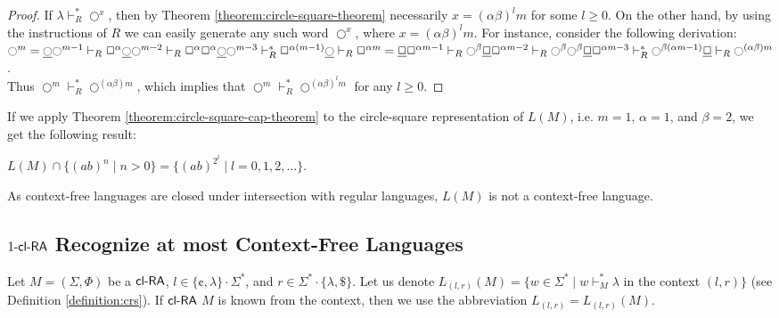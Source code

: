 \begin{proof}
If $\lambda \vdash_R^* \Circle^{x}$, then by Theorem \ref{theorem:circle-square-theorem} necessarily $x = (\alpha \beta)^l m$ for some $l \ge 0$. On the other hand, by using the instructions of $R$ we can easily generate any such word $\Circle^{x}$, where $x = (\alpha \beta)^l m$. For instance, consider the following derivation:\\
$\Circle^m = \underline{\Circle} \Circle^{m-1} \vdash_R \Square^{\alpha} \underline{\Circle} \Circle^{m-2} \vdash_R
\Square^{\alpha} \Square^{\alpha} \underline{\Circle} \Circle^{m-3} \vdash_R^*
\Square^{\alpha  (m-1)} \underline{\Circle} \vdash_R \Square^{\alpha  m} = \\
\underline{\Square} \Square^{\alpha  m - 1} \vdash_R
\Circle^{\beta} \underline{\Square} \Square^{\alpha  m - 2} \vdash_R
\Circle^{\beta} \Circle^{\beta} \underline{\Square} \Square^{\alpha  m - 3} \vdash_R^*
\Circle^{\beta (\alpha  m - 1)} \underline{\Square} \vdash_R \Circle^{(\alpha \beta)  m}$.\\
Thus $\Circle^m \vdash_R^* \Circle^{(\alpha \beta)  m}$, which implies that $\Circle^m \vdash_R^* \Circle^{(\alpha \beta)^l  m}$ for any $l \ge 0$.
\end{proof}

If we apply Theorem \ref{theorem:circle-square-cap-theorem} to the circle-square representation of $L(M)$, i.e. $m = 1$, $\alpha = 1$, and $\beta = 2$, we get the following result:

\begin{theorem}\label{theorem:4clRA}
$L(M) \cap \{(ab)^n \mid n > 0\} = \{(ab)^{2^l} \mid l = 0, 1, 2, \ldots\}$.
\end{theorem}

As context-free languages are closed under intersection with regular languages, $L(M)$ is not a context-free language.

\subsection{$\kclRA[1]$ Recognize at most Context-Free Languages}\label{1clRA}

Let $M = (\Sigma, \Phi)$ be a $\clRA$, $l \in \{ \cent, \lambda \} \cdot \Sigma^*$, and $r \in \Sigma^* \cdot \{ \lambda, \$ \}$. Let us denote $L_{(l,r)}(M) = \{w \in \Sigma^* \mid w \vdash_M^* \lambda$ in the context $(l,r) \}$ (see Definition \ref{definition:crs}). If $\clRA$ $M$ is known from the context, then we use the abbreviation $L_{(l,r)} = L_{(l,r)}(M)$.

